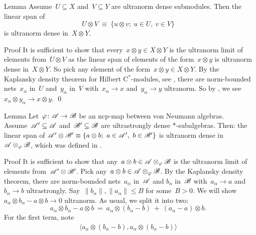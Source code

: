 \documentclass[b]{subfiles}
\begin{document}
\begin{parsec}
\begin{point}{Lemma}
Assume~$U \subseteq X$ and~$V \subseteq Y$
    are ultranorm dense submodules.
Then the linear span of
\begin{equation*}
    U \otimes V \ \equiv\  \{ u \otimes v;\  u \in U,\ v \in V\}
\end{equation*}
is ultranorm dense in~$X \otimes Y$.
\begin{point}{Proof}%
It is sufficient to show that every~$x \otimes y \in X \otimes Y$
    is the ultranorm limit of elements from~$U \otimes V$
    as the linear span of elements of the form~$x \otimes y$
    is ultranorm dense in~$X \otimes Y$.
So pick any element of the form~$x \otimes y \in X \otimes Y$.
By the Kaplansky density theorem for Hilbert C$^*$-modules,
 see ,
    there are norm-bounded nets~$x_\alpha$ in~$U$
    and~$y_\alpha$ in~$V$
    with~$x_\alpha \to x$ and~$y_\alpha \to y$ ultranorm.
So by ,
    we see~$x_\alpha \otimes y_\alpha \to x \otimes y$. \qed
\end{point}
\end{point}
\begin{point}{Lemma}%
Let~$\varphi \colon \mathscr{A} \to \mathscr{B}$ be an ncp-map between von Neumann algebras.
Assume~$\mathscr{A}' \subseteq \mathscr{A}$ and~$\mathscr{B}' \subseteq \mathscr{B}$
are ultrastrongly dense $*$-subalgebras.
Then: the linear span of
$ \mathscr{A}' \otimes \mathscr{B}'  \equiv \{ a \otimes b;\ a \in \mathscr{A}', \ b\in \mathscr{B}'\}$
is ultranorm dense in~$\mathscr{A} \otimes_\varphi \mathscr{B}$,
which was defined in  .
\begin{point}{Proof}%
It is sufficient to show that any~$a\otimes b \in \mathscr{A} \otimes_\varphi \mathscr{B}$
    is the ultranorm limit of elements from~$\mathscr{A}' \otimes \mathscr{B}'$.
    Pick any~$a\otimes b\in \mathscr{A} \otimes_\varphi \mathscr{B}$.
By the Kaplansky density theorem, 
    there are norm-bounded nets~$a_\alpha$ in~$\mathscr{A}$ and
    $b_\alpha$ in~$\mathscr{B}$
    with~$a_\alpha \to a$ and~$b_\alpha \to b$ ultrastrongly.
Say~$\|b_\alpha \|, \|a_\alpha\| \leq B$ for some~$B > 0$.
We will show~$a_\alpha \otimes b_\alpha - a\otimes b \to 0$ ultranorm.
As usual, we split it into two:
\begin{equation*}
a_\alpha \otimes b_\alpha - a \otimes b
\ = \ a_\alpha \otimes(b_\alpha -b )\  +\  (a_\alpha - a) \otimes b.
\end{equation*}
For the first term, note
\begin{align*}
    \langle a_\alpha \otimes (b_\alpha  - b),
    a_\alpha \otimes (b_\alpha  - b) \rangle

\end{align*}
\end{point}
\end{point}
\end{parsec}
\end{document}
